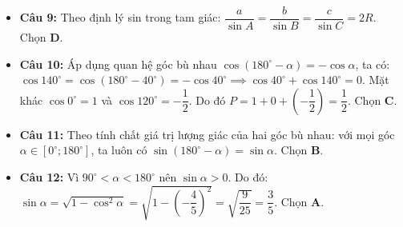 \documentclass[12pt,a4paper]{article}
\begin{document}
\begin{itemize}[leftmargin=0.6cm, itemsep=3pt]
    \item \textbf{Câu 9:} Theo định lý sin trong tam giác: $\dfrac{a}{\sin A} = \dfrac{b}{\sin B} = \dfrac{c}{\sin C} = 2R$. Chọn \textbf{D}.
    \item \textbf{Câu 10:} Áp dụng quan hệ góc bù nhau $\cos(180^\circ - \alpha) = -\cos \alpha$, ta có:
    $\cos 140^\circ = \cos(180^\circ - 40^\circ) = -\cos 40^\circ \implies \cos 40^\circ + \cos 140^\circ = 0$.
    Mặt khác $\cos 0^\circ = 1$ và $\cos 120^\circ = -\dfrac{1}{2}$.
    Do đó $P = 1 + 0 + \left(-\dfrac{1}{2}\right) = \dfrac{1}{2}$. Chọn \textbf{C}.
    \item \textbf{Câu 11:} Theo tính chất giá trị lượng giác của hai góc bù nhau: với mọi góc $\alpha \in [0^\circ; 180^\circ]$, ta luôn có $\sin(180^\circ - \alpha) = \sin \alpha$. Chọn \textbf{B}.
    \item \textbf{Câu 12:} Vì $90^\circ < \alpha < 180^\circ$ nên $\sin \alpha > 0$. Do đó:
    $\sin \alpha = \sqrt{1 - \cos^2 \alpha} = \sqrt{1 - \left(-\dfrac{4}{5}\right)^2} = \sqrt{\dfrac{9}{25}} = \dfrac{3}{5}$. Chọn \textbf{A}.
\end{itemize}
\end{document}
